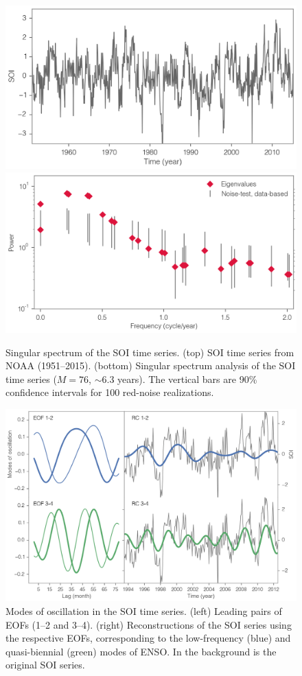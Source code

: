 \begin{figure}[!ht]
  \centering
  \includegraphics[width=.72\textwidth]{img/soi_time_series.png}\\
  \includegraphics[width=.72\textwidth]{img/ssa_spec_soi.png}
  \caption[Singular spectrum of the SOI time-series]{
  Singular spectrum of the SOI time series. (top) SOI time series from NOAA (1951--2015). (bottom) Singular spectrum analysis of the SOI time series ($M = 76$, $\sim$6.3 years). The vertical bars are 90\% confidence intervals for 100 red-noise realizations.
  }
  \label{c4f6}
\end{figure}


\begin{figure}[!ht]
  \centering
  \includegraphics[width=\textwidth]{img/ssa_eof_rc_v3.png}
  \caption[Modes of oscillation in the SOI time-series]{
  Modes of oscillation in the SOI time series. (left) Leading pairs of EOFs (1--2 and 3--4). (right) Reconstructions of the SOI series using the respective EOFs, corresponding to the low-frequency (blue) and quasi-biennial (green) modes of ENSO. In the background is the original SOI series.
  }
  \label{c4f7}
\end{figure}


